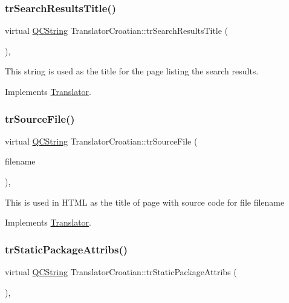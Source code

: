 \subsubsection{\texorpdfstring{trSearchResultsTitle()}{trSearchResultsTitle()}}
{\footnotesize\ttfamily virtual \mbox{\hyperlink{class_q_c_string}{Q\+C\+String}} Translator\+Croatian\+::tr\+Search\+Results\+Title (\begin{DoxyParamCaption}{ }\end{DoxyParamCaption})\hspace{0.3cm}{\ttfamily [inline]}, {\ttfamily [virtual]}}

This string is used as the title for the page listing the search results. 

Implements \mbox{\hyperlink{class_translator}{Translator}}.

\mbox{\label{class_translator_croatian_a442c63c810383f3dbab7f874bf6d248e}} 
\subsubsection{\texorpdfstring{trSourceFile()}{trSourceFile()}}
{\footnotesize\ttfamily virtual \mbox{\hyperlink{class_q_c_string}{Q\+C\+String}} Translator\+Croatian\+::tr\+Source\+File (\begin{DoxyParamCaption}\item[{\mbox{\hyperlink{class_q_c_string}{Q\+C\+String}} \&}]{filename }\end{DoxyParamCaption})\hspace{0.3cm}{\ttfamily [inline]}, {\ttfamily [virtual]}}

This is used in H\+T\+ML as the title of page with source code for file filename 

Implements \mbox{\hyperlink{class_translator}{Translator}}.

\mbox{\label{class_translator_croatian_a6c742527cc027b554c1614b41d89f9c5}} 
\subsubsection{\texorpdfstring{trStaticPackageAttribs()}{trStaticPackageAttribs()}}
{\footnotesize\ttfamily virtual \mbox{\hyperlink{class_q_c_string}{Q\+C\+String}} Translator\+Croatian\+::tr\+Static\+Package\+Attribs (\begin{DoxyParamCaption}{ }\end{DoxyParamCaption})\hspace{0.3cm}{\ttfamily [inline]}, {\ttfamily [virtual]}}

